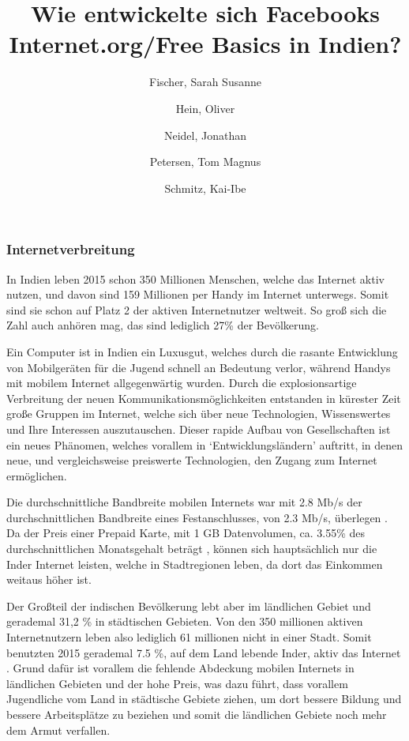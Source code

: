 \documentclass{article}
\title{Wie entwickelte sich Facebooks Internet.org/Free Basics in Indien?}
\author{
  Fischer, Sarah Susanne\\
  \and
  Hein, Oliver\\
  \and
  Neidel, Jonathan\\
  \and
  Petersen, Tom Magnus\\
  \and
  Schmitz, Kai-Ibe\\
}
\begin{document}
\maketitle
\subsubsection{Internetverbreitung}

In Indien leben 2015 schon 350 Millionen Menschen\autocite{slideshareIndia}, welche das Internet aktiv nutzen, und davon sind 159 Millionen per Handy im Internet unterwegs. Somit sind sie schon auf Platz 2 der aktiven Internetnutzer weltweit. So groß sich die Zahl auch anhören mag, das sind lediglich 27\% der Bevölkerung\autocite{InternetCountry}. 

Ein Computer ist in Indien ein Luxusgut, welches durch die rasante Entwicklung von Mobilgeräten für die Jugend schnell an Bedeutung verlor, während Handys mit mobilem Internet allgegenwärtig wurden.
Durch die explosionsartige Verbreitung der neuen Kommunikationsmöglichkeiten entstanden in kürester Zeit große Gruppen im Internet, welche sich über neue Technologien, Wissenswertes und Ihre Interessen auszutauschen.
Dieser rapide Aufbau von Gesellschaften ist ein neues Phänomen, welches vorallem in `Entwicklungsländern' auftritt, in denen neue, und vergleichsweise preiswerte Technologien, den Zugang zum Internet ermöglichen.   \textcite{empowermentThroughFacebook}

\medskip
Die durchschnittliche Bandbreite mobilen Internets war mit 2.8 Mb/s der durchschnittlichen Bandbreite eines Festanschlusses, von 2.3 Mb/s, überlegen \autocite{slideshareIndia}.
Da der Preis einer Prepaid Karte, mit 1 GB Datenvolumen, ca. 3.55\% des durchschnittlichen Monatsgehalt beträgt \autocite{broadbandAgency}, können sich hauptsächlich nur die Inder Internet leisten, welche in Stadtregionen leben, da dort das Einkommen weitaus höher ist.

 Der Großteil der indischen Bevölkerung lebt aber im ländlichen Gebiet  und gerademal 31,2 \% \autocite{IndiaBevölkerung} in städtischen Gebieten. 
Von den 350 millionen aktiven Internetnutzern leben also lediglich 61 millionen nicht in einer Stadt. Somit benutzten 2015 gerademal 7.5 \%, auf dem Land lebende Inder, aktiv das Internet \autocite{slideshareIndia}.
Grund dafür ist vorallem die fehlende Abdeckung mobilen Internets in ländlichen Gebieten und der hohe Preis, was dazu führt, dass vorallem Jugendliche vom Land in städtische Gebiete ziehen, um dort bessere Bildung und bessere Arbeitsplätze zu beziehen und somit die ländlichen Gebiete noch mehr dem Armut verfallen. 


\end{document}
